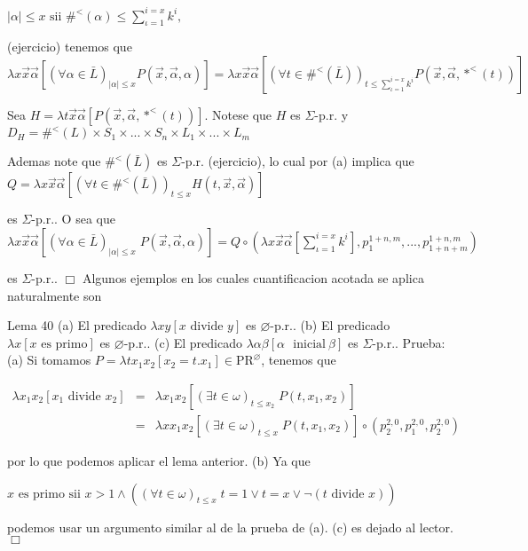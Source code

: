 \(\displaystyle \left\vert \alpha \right\vert \leq x\text{ sii }\#^{< }(\alpha )\leq \sum_{\iota =1}^{i=x}k^{i}, \)

(ejercicio) tenemos que
\(\displaystyle \lambda x\vec{x}\vec{\alpha}\left[ (\forall \alpha \in \bar{L})_{\left\vert \alpha \right\vert \leq x}P(\vec{x},\vec{\alpha},\alpha )\right] =\lambda x \vec{x}\vec{\alpha}\left[ (\forall t\in \#^{< }(\bar{L}))_{t\leq \sum_{\iota =1}^{i=x}k^{i}}P(\vec{x},\vec{\alpha},\ast ^{< }(t))\right] \)

Sea \(H=\lambda t\vec{x}\vec{\alpha}\left[ P(\vec{x},\vec{\alpha},\ast ^{< }(t))\right] .\) Notese que \(H\) es \(\Sigma \)-p.r. y
\(\displaystyle D_{H}=\#^{< }(L)\times S_{1}\times ...\times S_{n}\times L_{1}\times ...\times L_{m} \)

Ademas note que \(\#^{< }(\bar{L})\) es \(\Sigma \)-p.r. (ejercicio), lo cual por (a) implica que
\(\displaystyle Q=\lambda x\vec{x}\vec{\alpha}\left[ (\forall t\in \#^{< }(\bar{L}))_{t\leq x}H(t,\vec{x},\vec{\alpha})\right] \)

es \(\Sigma \)-p.r.. O sea que
\(\displaystyle \lambda x\vec{x}\vec{\alpha}\left[ (\forall \alpha \in \bar{L})_{\left\vert \alpha \right\vert \leq x}\;P(\vec{x},\vec{\alpha},\alpha )\right] =Q\circ \left( \lambda x\vec{x}\vec{\alpha}\left[ \sum\limits_{\iota =1}^{i=x}k^{i} \right] ,p_{1}^{1+n,m},...,p_{1+n+m}^{1+n,m}\right) \)

es \(\Sigma \)-p.r.. \(\Box\)
Algunos ejemplos en los cuales cuantificacion acotada se aplica naturalmente son


Lema 40
(a) El predicado \(\lambda xy\left[ x\text{ divide }y\right] \) es \( \varnothing \)-p.r..
(b) El predicado \(\lambda x\left[ x\text{ es primo}\right] \) es \( \varnothing \)-p.r..
(c) El predicado \(\lambda \alpha \beta \left[ \alpha \text{\ }\mathrm{ inicial}\ \beta \right] \) es \(\Sigma \)-p.r..
Prueba: (a) Si tomamos \(P=\lambda tx_{1}x_{2}\left[ x_{2}=t.x_{1}\right] \in \mathrm{PR}^{\varnothing }\), tenemos que

\(\displaystyle \begin{array}{rcl} \lambda x_{1}x_{2}\left[ x_{1}\text{ divide }x_{2}\right] & =& \lambda x_{1}x_{2}\left[ (\exists t\in \omega )_{t\leq x_{2}}\;P(t,x_{1},x_{2}) \right] \\ & =& \lambda xx_{1}x_{2}\left[ (\exists t\in \omega )_{t\leq x}\;P(t,x_{1},x_{2})\right] \circ \left( p_{2}^{2,0},p_{1}^{2,0},p_{2}^{2,0}\right) \end{array} \)

por lo que podemos aplicar el lema anterior.
(b) Ya que

\(\displaystyle x\text{ es primo sii }x >1\wedge \left( (\forall t\in \omega )_{t\leq x}\;t=1\vee t=x\vee \lnot (t\text{ divide }x)\right) \)

podemos usar un argumento similar al de la prueba de (a).
(c) es dejado al lector. \(\Box\)
